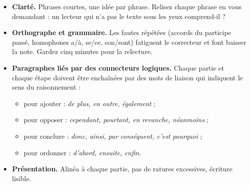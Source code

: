 \documentclass[11pt]{article}
\begin{document}
\begin{itemize}
\item \textbf{Clarté.} Phrases courtes, une idée par phrase. Relisez chaque phrase en vous demandant : \og un lecteur qui n'a pas le texte sous les yeux comprend-il ?\fg{}
\item \textbf{Orthographe et grammaire.} Les fautes répétées (accords du participe passé, homophones \og a/à\fg{}, \og se/ce\fg{}, \og son/sont\fg{}) fatiguent le correcteur et font baisser la note. Gardez cinq minutes pour la relecture.
\item \textbf{Paragraphes liés par des connecteurs logiques.} Chaque partie et chaque étape doivent être enchaînées par des mots de liaison qui indiquent le sens du raisonnement :
\begin{itemize}
\item pour ajouter : \emph{de plus, en outre, également} ;
\item pour opposer : \emph{cependant, pourtant, en revanche, néanmoins} ;
\item pour conclure : \emph{donc, ainsi, par conséquent, c'est pourquoi} ;
\item pour ordonner : \emph{d'abord, ensuite, enfin}.
\end{itemize}
\item \textbf{Présentation.} Alinéa à chaque partie, pas de ratures excessives, écriture lisible.
\end{itemize}
\end{document}
